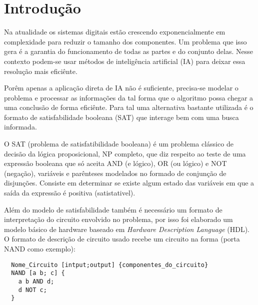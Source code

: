 \section{Introdução}
\label{sec:introducao}

Na atualidade os sistemas digitais estão crescendo exponencialmente em complexidade para reduzir o tamanho dos componentes. Um problema que isso gera é a garantia do funcionamento de todas as partes e do conjunto delas. Nesse contexto podem-se usar métodos de inteligência artificial (IA) para deixar essa resolução mais eficiênte.

Porêm apenas a aplicação direta de IA não é suficiente, precisa-se modelar o problema e processar as informações da tal forma que o algoritmo possa chegar a uma conclusão de forma eficiênte. Para tal uma alternativa bastante utilizada é o formato de satisfabilidade booleana (SAT) que interage bem com uma busca informada. 

O SAT (problema de satisfatibilidade booleana) é um problema clássico de decisão da lógica proposicional, NP completo, que diz respeito ao teste de uma expressão booleana que só aceita AND (e lógico), OR (ou lógico) e NOT (negação), variáveis e parênteses modelados no formado de conjunção de disjunções. Consiste em determinar se existe algum estado das variáveis em que a saída da expressão é positiva (satistativel).

Além do modelo de satisfabilidade também é necessário um formato de interpretação do circuito envolvido no problema, por isso foi elaborado um modelo básico de hardware baseado em \textit{Hardware Description Language} (HDL). O formato de descrição de circuito usado recebe um circuito na forma (porta NAND como exemplo):
\begin{lstlisting}
  Nome_Circuito [intput;output] {componentes_do_circuito}
  NAND [a b; c] {
    a b AND d;
    d NOT c;
  }
\end{lstlisting}
